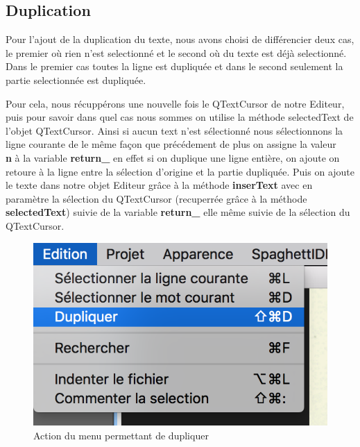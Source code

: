 \documentclass[a4paper,12pt]{article}
\begin{document}
	\newpage

\subsection{Duplication}

	Pour l'ajout de la duplication du texte, nous avons choisi de différencier deux cas, le premier où rien n'est selectionné et le second où du texte est déjà selectionné. Dans le premier cas toutes la ligne est dupliquée et dans le second seulement la partie selectionnée est dupliquée.

	Pour cela, nous récuppérons une nouvelle fois le QTextCursor de notre Editeur, puis pour savoir dans quel cas nous sommes on utilise la méthode selectedText de l'objet QTextCursor. Ainsi si aucun text n'est sélectionné nous sélectionnons la ligne courante de le même façon que précédement de plus on assigne la valeur  \textbf{\\n} à la variable \textbf{return\_} en effet si on duplique une ligne entière, on ajoute on retoure à la ligne entre la sélection d'origine et la partie dupliquée. Puis on ajoute le texte dans notre objet Editeur grâce à la méthode \textbf{inserText} avec en paramètre la sélection du QTextCursor (recuperrée grâce à la méthode \textbf{selectedText}) suivie de la variable \textbf{return\_} elle même suivie de la sélection du QTextCursor.

	\begin{figure}[h!]
		\begin{center}
			\includegraphics[scale=0.8]{images/imgs_edit/utilisation_duplication}
			\caption{Action du menu permettant de dupliquer}
		\end{center}
	\end{figure}
\end{document}
